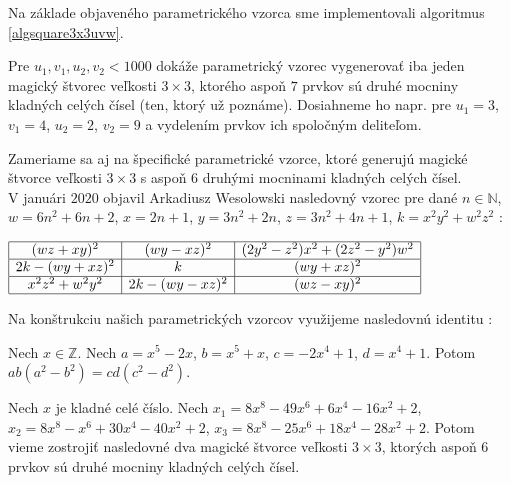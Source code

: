 Na základe objaveného parametrického vzorca sme implementovali algoritmus \ref{algsquare3x3uvw}.

\begin{result} Pre $u_1, v_1, u_2, v_2 < 1000$ dokáže parametrický vzorec vygenerovať iba jeden magický štvorec veľkosti $3 \times 3$, ktorého aspoň $7$ prvkov sú druhé mocniny kladných celých čísel (ten, ktorý už poznáme). Dosiahneme ho napr. pre $u_1 = 3$, $v_1 = 4$, $u_2 = 2$, $v_2 = 9$ a vydelením prvkov ich spoločným deliteľom.
\end{result}

Zameriame sa aj na špecifické parametrické vzorce, ktoré generujú magické štvorce veľkosti $3 \times 3$ s aspoň $6$ druhými mocninami kladných celých čísel. \\

V januári $2020$ objavil Arkadiusz Wesolowski nasledovný vzorec pre dané $n \in \mathbb{N}$, $w = 6n^2 + 6n + 2$, $x = 2n + 1$, $y = 3n^2 + 2n$, $z = 3n^2 + 4n + 1$, $k = x^2 y^2 + w^2 z^2$ \cite{multimagie}:

\begin{center}
$\begin{array}{ |c|c|c| } 
\hline
(wz + xy)^2 & (wy - xz)^2 & (2y^2 - z^2)x^2 + (2z^2 - y^2)w^2 \\ 
\hline
2k - (wy + xz)^2 & k & (wy + xz)^2 \\ 
\hline
x^2 z^2 + w^2 y^2 & 2k - (wy - xz)^2 & (wz - xy)^2 \\
\hline
\end{array}$
\end{center}

Na konštrukciu našich parametrických vzorcov využijeme nasledovnú identitu \cite{algebraic}:


\begin{lemma}
\label{square3x3x}
Nech $x \in \mathbb{Z}$. Nech $a = x^5 - 2x$, $b = x^5 + x$, $c = -2x^4 + 1$, $d = x^4 + 1$. Potom $ab(a^2 - b^2) = cd(c^2 - d^2)$.
\end{lemma}

\begin{theorem}
\label{3x3square6squares}
Nech $x$ je kladné celé číslo. Nech $x_1 = 8x^8 - 49x^6 + 6x^4 - 16x^2 + 2$, $x_2 = 8x^8 - x^6 + 30x^4 - 40x^2 + 2$, $x_3 = 8x^8 - 25x^6 + 18x^4 - 28x^2 + 2$. Potom vieme zostrojiť nasledovné dva magické štvorce veľkosti $3 \times 3$, ktorých aspoň $6$ prvkov sú druhé mocniny kladných celých čísel.
\end{theorem}

